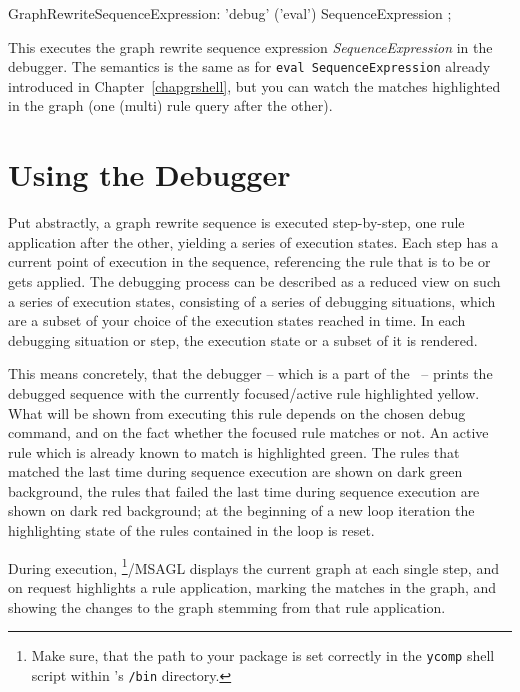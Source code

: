 \begin{rail}
  GraphRewriteSequenceExpression: 'debug' ('eval') SequenceExpression ;
\end{rail}
This executes the graph rewrite sequence expression \emph{SequenceExpression} in the debugger.
The semantics is the same as for \texttt{eval SequenceExpression} already introduced in Chapter~\ref{chapgrshell}, but you can watch the matches highlighted in the graph (one (multi) rule query after the other).

\pagebreak

\section{Using the Debugger}

Put abstractly, a graph rewrite sequence is executed step-by-step, one rule application after the other, yielding a series of execution states.
Each step has a current point of execution in the sequence, referencing the rule that is to be or gets applied.
The debugging process can be described as a reduced view on such a series of execution states,
consisting of a series of debugging situations, which are a subset of your choice of the execution states reached in time.
In each debugging situation or step, the execution state or a subset of it is rendered.

This means concretely, that the debugger -- which is a part of the \GrShell~--
prints the debugged sequence with the currently focused/active rule highlighted yellow.
What will be shown from executing this rule depends on the chosen debug command,
and on the fact whether the focused rule matches or not.
An active rule which is already known to match is highlighted green.
The rules that matched the last time during sequence execution are shown on dark green background,
the rules that failed the last time during sequence execution are shown on dark red background;
at the beginning of a new loop iteration the highlighting state of the rules contained in the loop is reset.

During execution, \yComp\footnote{Make sure, that the path to your \texttt{} package is set correctly in the \texttt{ycomp} shell script within \GrG's \texttt{/bin} directory.}/MSAGL
displays the current graph at each single step, and on request highlights a rule application, marking the matches in the graph, and showing the changes to the graph stemming from that rule application.

